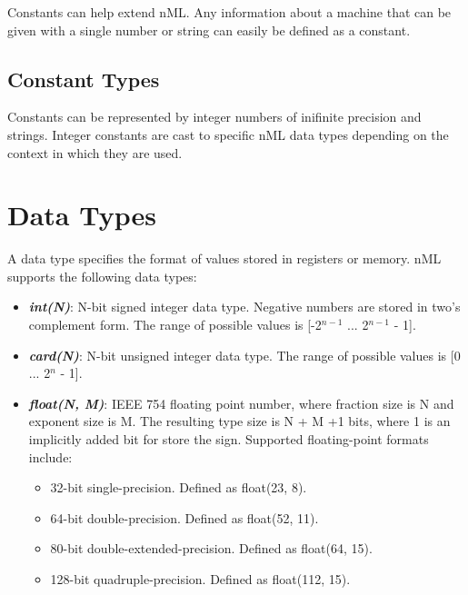 \documentclass[oneside,final,14pt]{extreport}
\begin{document}
Constants can help extend nML. Any information about a machine that can be given with
a single number or string can easily be defined as a constant.

\subsection{Constant Types}

Constants can be represented by integer numbers of inifinite precision and strings.
Integer constants are cast to specific nML data types depending on the context in
which they are used.


\section{Data Types}

A data type specifies the format of values stored in registers or memory.
nML supports the following data types:

\begin{itemize}

\item \textbf{\textit{int(N)}}:
N-bit signed integer data type. Negative numbers are stored in two's complement
form. The range of possible values is [-2$^{n-1}$ ... 2$^{n-1}$ - 1].

\item \textbf{\textit{card(N)}}:
N-bit unsigned integer data type. The range of possible values is [0 ... 2$^n$ - 1].

\item \textbf{\textit{float(N, M)}}: IEEE 754 floating point number, where fraction
size is N and exponent size is M. The resulting type size is N + M +1 bits, where 1
is an implicitly added bit for store the sign. Supported floating-point formats include:

\begin{itemize}
\item 32-bit single-precision. Defined as float(23, 8).
\item 64-bit double-precision. Defined as float(52, 11).
\item 80-bit double-extended-precision. Defined as float(64, 15).
\item 128-bit quadruple-precision. Defined as float(112, 15).
\end{itemize}

\end{itemize}
\end{document}
